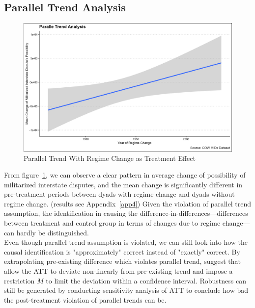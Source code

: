 \documentclass[12pt,a4paper]{article}
\begin{document}
\subsection{Parallel Trend Analysis}
\begin{figure}[!ht]
\centering
\includegraphics[width=1\linewidth]{paratrend.png}
\caption{Parallel Trend With Regime Change as Treatment Effect\label{fig:paratrend}}
\end{figure}
\noindent From figure~\ref{fig:paratrend}, we can observe a clear pattern in average change of possibility of militarized interstate disputes, and the mean change is significantly different in pre-treatment periods between dyads with regime change and dyads without regime change.  (results see Appendix~\ref{app4}) Given the violation of parallel trend assumption, the identification in causing the difference-in-differences---differences between treatment and control group in terms of changes due to regime change---can hardly be distinguished. 
\\Even though parallel trend assumption is violated, we can still look into how the causal identification is "approximately" correct instead of "exactly" correct. \parencite{rambachan_2023_a} By extrapolating pre-existing difference which violates parallel trend, \textcite{rambachan_2023_a} suggest that allow the ATT to deviate non-linearly from pre-existing trend and impose a restriction $M$ to limit the deviation within a confidence interval. Robustness can still be generated by conducting sensitivity analysis of ATT to conclude how bad the post-treatment violation of parallel trends can be.
\end{document}
